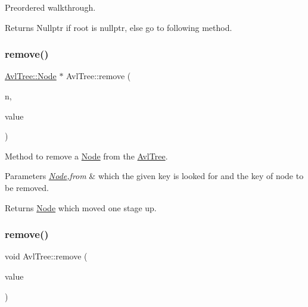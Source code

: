 Preordered walkthrough. \begin{DoxyReturn}{Returns}
Nullptr if root is nullptr, else go to following method. 
\end{DoxyReturn}
\mbox{\label{class_avl_tree_a156d81b7e3c6974c969876f48578e0d8}} 
\subsubsection{\texorpdfstring{remove()}{remove()}\hspace{0.1cm}{\footnotesize\ttfamily [1/2]}}
{\footnotesize\ttfamily \mbox{\hyperlink{struct_avl_tree_1_1_node}{Avl\+Tree\+::\+Node}} $\ast$ Avl\+Tree\+::remove (\begin{DoxyParamCaption}\item[{\mbox{\hyperlink{struct_avl_tree_1_1_node}{Avl\+Tree\+::\+Node}} $\ast$}]{n,  }\item[{const int}]{value }\end{DoxyParamCaption})}

Method to remove a \mbox{\hyperlink{struct_avl_tree_1_1_node}{Node}} from the \mbox{\hyperlink{class_avl_tree}{Avl\+Tree}}. 
\begin{DoxyParams}{Parameters}
{\em \mbox{\hyperlink{struct_avl_tree_1_1_node}{Node}},from} & which the given key is looked for and the key of node to be removed. \\
\hline
\end{DoxyParams}
\begin{DoxyReturn}{Returns}
\mbox{\hyperlink{struct_avl_tree_1_1_node}{Node}} which moved one stage up. 
\end{DoxyReturn}
\mbox{\label{class_avl_tree_ac8d4f996561392f0916caeaf48fac088}} 
\subsubsection{\texorpdfstring{remove()}{remove()}\hspace{0.1cm}{\footnotesize\ttfamily [2/2]}}
{\footnotesize\ttfamily void Avl\+Tree\+::remove (\begin{DoxyParamCaption}\item[{const int}]{value }\end{DoxyParamCaption})}

